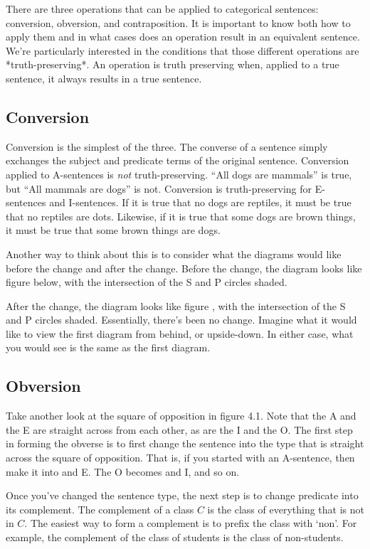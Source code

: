 \documentclass[../logic-text.tex]{subfiles}
\begin{document}
There are three operations that can be applied to categorical sentences: conversion, obversion, and contraposition. It is important to know both how to apply them and in what cases does an operation result in an equivalent sentence. We're particularly interested in the conditions that those different operations are *truth-preserving*. An operation is truth preserving when, applied to a true sentence, it always results in a true sentence.

\subsection{Conversion}


Conversion is the simplest of the three. The converse of a sentence simply exchanges the subject and predicate terms of the original sentence. Conversion applied to A-sentences is \emph{not} truth-preserving. \enquote{All dogs are mammals} is true, but \enquote{All mammals are dogs} is not. Conversion is truth-preserving for E-sentences and I-sentences. If it is true that no dogs are reptiles, it must be true that no reptiles are dots. Likewise, if it is true that some dogs are brown things, it must be true that some brown things are dogs.

Another way to think about this is to consider what the diagrams would like before the change and after the change. Before the change, the diagram looks like figure below, with the intersection of the S and P circles shaded.

After the change, the diagram looks like figure , with the intersection of the S and P circles shaded. Essentially, there's been no change. Imagine what it would like to view the first diagram from behind, or upside-down. In either case, what you would see is the same as the first diagram.


\subsection{Obversion}

Take another look at the square of opposition in figure 4.1. Note that the A and the E are straight across from each other, as are the I and the O. The first step in forming the obverse is to first change the sentence into the type that is straight across the square of opposition. That is, if you started with an A-sentence, then make it into and E. The O becomes and I, and so on.


Once you've changed the sentence type, the next step is to change predicate into its complement. The complement of a class $C$ is the class of everything that is not in $C$. The easiest way to form a complement is to prefix the class with `non'. For example, the complement of the class of students is the class of non-students.
\end{document}
